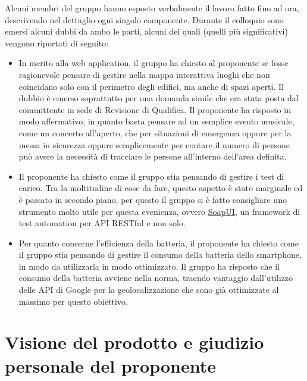 \documentclass{article}
\begin{document}
Alcuni membri del gruppo hanno esposto verbalmente il lavoro fatto fino ad ora, descrivendo nel dettaglio ogni singolo componente.
Durante il colloquio sono emersi alcuni dubbi da ambo le parti, alcuni dei quali (quelli più significativi) vengono riportati di seguito:
\begin{itemize}
  \item In merito alla web application, il gruppo ha chiesto al proponente se fosse ragionevole pensare di gestire nella mappa interattiva luoghi che non coincidano solo con il perimetro degli edifici, ma anche di spazi aperti. Il dubbio è emerso soprattutto per una domanda simile che era stata posta dal committente in sede di Revisione di Qualifica. Il proponente ha risposto in modo affermativo, in quanto basta pensare ad un semplice evento musicale, come un concerto all'aperto, che per situazioni di emergenza oppure per la messa in sicurezza oppure semplicemente per contare il numero di persone può avere la necessità di tracciare le persone all'interno dell'area definita.
  \item Il proponente ha chiesto come il gruppo stia pensando di gestire i test di carico. Tra la moltitudine di cose da fare, questo aspetto è stato marginale ed è passato in secondo piano, per questo il gruppo si è fatto consigliare uno strumento molto utile per questa evenienza, ovvero \href{https://www.soapui.org/}{SoapUI}, un framework di test automation per API RESTful e non solo.
  \item Per quanto concerne l'efficienza della batteria, il proponente ha chiesto come il gruppo stia pensando di gestire il consumo della batteria dello smartphone, in modo da utilizzarla in modo ottimizzato. Il gruppo ha risposto che il consumo della batteria avviene nella norma, traendo vantaggio dall'utilizzo delle API di Google per la geolocalizzazione che sono già ottimizzate al massimo per questo obiettivo.
\end{itemize}

\section{Visione del prodotto e giudizio personale del proponente}%
\label{sec:visione_del_prodotto_e_giudizio_personale_del_proponente}
\end{document}
